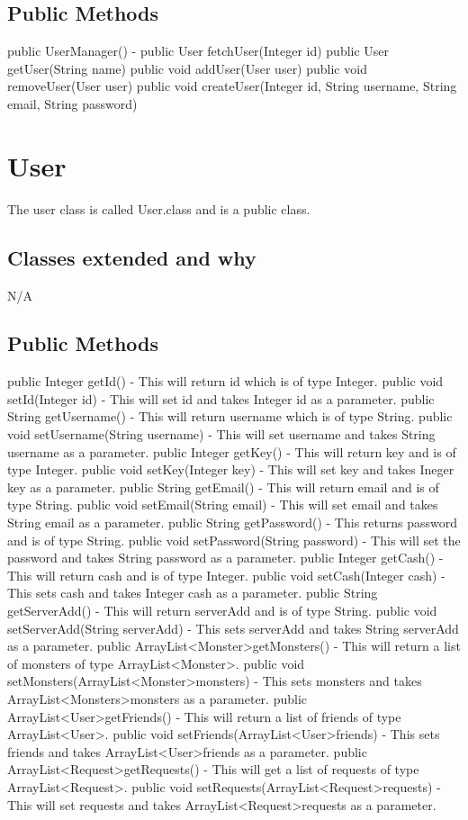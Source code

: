 \documentclass{project}
\begin{document}
\subsection{Public Methods}
public UserManager() - 
public User fetchUser(Integer id)
public User getUser(String name)
public void addUser(User user)
public void removeUser(User user)
public void createUser(Integer id, String username, String email, String password)


\section{User}
The user class is called User.class and is a public class.
\subsection{Classes extended and why}
N/A
\subsection{Public Methods}
public Integer getId() - This will return id which is of type Integer. public void setId(Integer id) - This will set id and takes Integer id as a parameter.
public String getUsername() - This will return username which is of type String. public void setUsername(String username) - This will set username and takes String username as a parameter.
public Integer getKey() - This will return key and is of type Integer. public void setKey(Integer key) - This will set key and takes Ineger key as a parameter.
public String getEmail() - This will return email and is of type String. public void setEmail(String email) - This will set email and takes String email as a parameter.
public String getPassword() - This returns password and is of type String. public void setPassword(String password) - This will set the password and takes String password as a parameter.
public Integer getCash() - This will return cash and is of type Integer. public void setCash(Integer cash) - This sets cash and takes Integer cash as a parameter.
public String getServerAdd() - This will return serverAdd and is of type String. public void setServerAdd(String serverAdd) - This sets serverAdd and takes String serverAdd as a parameter.
public ArrayList\textless Monster\textgreater  getMonsters() - This will return a list of monsters of type ArrayList\textless Monster\textgreater. public void setMonsters(ArrayList\textless Monster\textgreater  monsters) - This sets monsters and takes ArrayList\textless Monsters\textgreater  monsters as a parameter.
public ArrayList\textless User\textgreater  getFriends() - This will return a list of friends of type ArrayList\textless User\textgreater. public void setFriends(ArrayList\textless User\textgreater  friends) - This sets friends and takes ArrayList\textless User\textgreater  friends as a parameter.
public ArrayList\textless Request\textgreater  getRequests() - This will get a list of requests of type ArrayList\textless Request\textgreater. public void setRequests(ArrayList\textless Request\textgreater  requests) - This will set requests and takes ArrayList\textless Request\textgreater  requests as a parameter.
\end{document}
